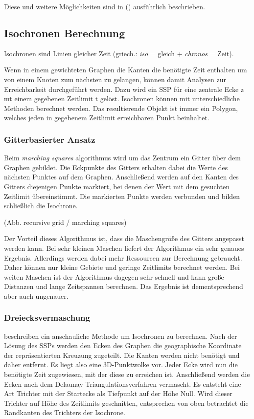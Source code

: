 \documentclass[12pt,a4paper]{article}
\begin{document}
Diese und weitere Möglichkeiten sind in (\cite[209--213]{kurt}) ausführlich beschrieben.

\subsection{Isochronen Berechnung}

Isochronen sind Linien gleicher Zeit (griech.: \textit{iso} = gleich + \textit{chronos} = Zeit).

Wenn in einem gewichteten Graphen die Kanten die benötigte Zeit enthalten um von einem Knoten zum nächsten zu gelangen, können damit Analysen zur Erreichbarkeit durchgeführt werden. Dazu wird ein SSP für eine zentrale Ecke z mt einem gegebenen Zeitlimit t gelöst. 
Isochronen können mit unterschiedliche Methoden berechnet werden. Das resultierende Objekt ist immer ein Polygon, welches jeden in gegebenem Zeitlimit erreichbaren Punkt beinhaltet.


\subsubsection{Gitterbasierter Ansatz}
Beim \textit{marching squares} algorithmus wird um das Zentrum ein Gitter über dem Graphen gebildet. Die Eckpunkte des Gitters erhalten dabei die Werte des nächsten Punktes auf dem Graphen. Anschließend werden auf den Kanten des Gitters diejenigen Punkte markiert, bei denen der Wert mit dem gesuchten Zeitlimit übereinstimmt. Die markierten Punkte werden verbunden und bilden schließlich die Isochrone.

(Abb. recursive grid / marching squares)

Der Vorteil dieses Algorithmus ist, dass die Maschengröße des Gitters angepasst werden kann. Bei sehr kleinen Maschen liefert der Algorithmus ein sehr genaues Ergebnis. Allerdings werden dabei mehr Ressourcen zur Berechnung gebraucht. Daher können nur kleine Gebiete und geringe Zeitlimits berechnet werden. Bei weiten Maschen ist der Algorithmus dagegen sehr schnell und kann große Distanzen und lange Zeitspannen berechnen. Das Ergebnis ist dementsprechend aber auch ungenauer.

\subsubsection{Dreiecksvermaschung}
\cite{isochrones} beschreiben ein anschauliche Methode um Isochronen zu berechnen. Nach der Lösung des SSPs werden den Ecken des Graphen die geographische Koordinate der repräsentierten Kreuzung zugeteilt. Die Kanten werden nicht benötigt und daher entfernt. Es liegt also eine 3D-Punktwolke vor. Jeder Ecke wird nun die benötigte Zeit zugewiesen, mit der diese zu erreichen ist. Anschließend werden die Ecken nach dem Delaunay Triangulationsverfahren vermascht. Es entsteht eine Art Trichter mit der Startecke als Tiefpunkt auf der Höhe Null. Wird dieser Trichter auf Höhe des Zeitlimits geschnitten, entsprechen von oben betrachtet die Randkanten des Trichters der Isochrone.
\end{document}
